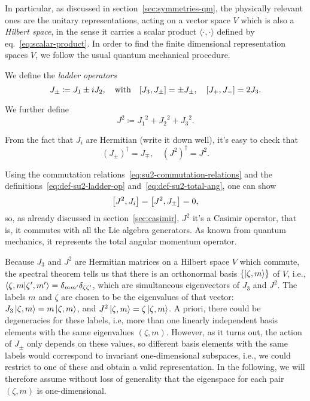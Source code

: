 In particular, as discussed in section~\ref{sec:symmetries-qm}, the physically relevant ones are the unitary representations, acting on a vector space $V$ which is also a \emph{Hilbert space}, in the sense it carries a scalar product $\langle \cdot, \cdot \rangle$ defined by eq.~\eqref{eq:scalar-product}. In order to find the finite dimensional representation spaces $V$, we follow the usual quantum mechanical procedure.

We define the \emph{ladder operators}
\begin{equation}\label{eq:def-su2-ladder-op}
    J_\pm \coloneq J_1 \pm i J_2, \quad \textup{with} \quad \comm{J_3}{J_\pm} = \pm J_\pm, \quad \comm{J_+}{J_-} = 2 J_3 .
\end{equation}

We further define
\begin{equation}\label{eq:def-su2-total-ang}
    J^2 \coloneq {J_1}^2 + {J_2}^2 + {J_3}^2.
\end{equation}

From the fact that $J_i$ are Hermitian (\color{red}write it down well\color{blue}), it's easy to check that
\begin{equation}
    (J_\pm)^\dagger = J_\mp, \quad (J^2)^\dagger = J^2 .
\end{equation}

Using the commutation relations~\eqref{eq:su2-commutation-relations} and the definitions~\eqref{eq:def-su2-ladder-op} and~\eqref{eq:def-su2-total-ang}, one can show
\begin{equation}
    \comm{J^2}{J_i} = \comm{J^2}{J_\pm} = 0,
\end{equation}
so, as already discussed in section~\eqref{sec:casimir}, $J^2$ it's a Casimir operator, that is, it commutes with all the Lie algebra generators. As known from quantum mechanics, it represents the total angular momentum operator.

Because $J_3$ and $J^2$ are Hermitian matrices on a Hilbert space $V$ which commute, the spectral theorem tells us that there is an orthonormal basis $\{ \ket{\zeta, m} \}$ of $V$, i.e., $\braket{\zeta, m}{\zeta',m'} = \delta_{mm'} \delta_{\zeta\zeta'}$, which are simultaneous eigenvectors of $J_3$ and $J^2$. The labels $m$ and $\zeta$ are chosen to be the eigenvalues of that vector: $J_3 \ket{\zeta, m} = m \ket{\zeta, m}$, and $J^2 \ket{\zeta, m} = \zeta \ket{\zeta, m}$. A priori, there could be degeneracies for these labels, i.e, more than one linearly independent basis elements with the same eigenvalues $(\zeta,m)$. However, as it turns out, the action of $J_\pm$ only depends on these values, so different basis elements with the same labels would correspond to invariant one-dimensional subspaces, i.e., we could restrict to one of these and obtain a valid representation. In the following, we will therefore assume without loss of generality that the eigenspace for each pair $(\zeta,m)$ is one-dimensional.

